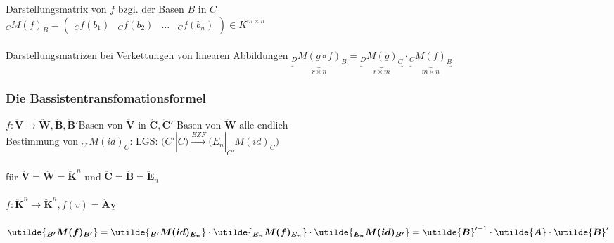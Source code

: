 \documentclass[6pt,a4paper]{scrartcl}
\newcommand{\ma}[1]{\ensuremath{\utilde{\boldsymbol {#1}}}}										%
\renewcommand{\vec}[1]{\ensuremath{\underline{\boldsymbol {#1}}}}								%
\newcommand{\ra}[0]{\ensuremath{\rightarrow}} 									%
\begin{document}
\begin{multicols}{4}
Darstellungsmatrix von $f$ bzgl.  der Basen $B$ in $C$ \\
$_C M(f)_B  = \begin{pmatrix}_C f(b_1)& _C f(b_2) &\ldots &_C	 f(b_n)\end{pmatrix} \in K^{m \times n}$
\\ \\
Darstellungsmatrizen bei Verkettungen von linearen Abbildungen
	$\underbrace{_D M (g \circ f)_B}_{r \times n} = \underbrace{_D M(g)_C}_{r \times m} \cdot \underbrace{_C M(f)_B}_{m \times n}$
	
\subsubsection{Die Bassistentransfomationsformel}

$f: \ma V \ra \ma W, \ma B, \ma B' \text{Basen von } \ma V \text{ in } \ma C, \ma C' \text{ Basen von } \ma W \text{ alle endlich }$
\\
Bestimmung von $_{C'}M(id)_C$: LGS: $\bigl(C' | C\bigr) \overset{EZF}{\longrightarrow} \bigl( E_n | _{C'}M(id)_C \bigr)$
\\ \\
für $\ma V = \ma W = \ma K^n$ und $\ma C = \ma B = \ma E_n$ \\ \\
$f: \ma K^n \ra \ma K^n , f(v) = \ma A \vec v$
\\ \\
$ \ma{_{B'} M(f)_{B'}} = \ma{_{B'} M(id)_{E_n}} \cdot \ma{_{E_n} M(f)_{E_n}} \cdot \ma{_{E_n} M(id)_{B'}} =\\ \ma B'^{-1} \cdot \ma A \cdot \ma B' $



\end{multicols}
\end{document}
